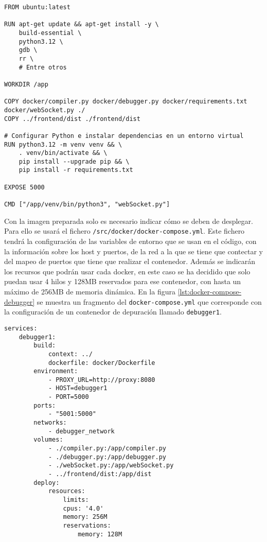 \begin{lstlisting}[caption={Dockerfile para el contenedor de depuración}, label={lst:dockerfile-debugger}]
FROM ubuntu:latest

RUN apt-get update && apt-get install -y \
    build-essential \
    python3.12 \
    gdb \
    rr \
    # Entre otros

WORKDIR /app

COPY docker/compiler.py docker/debugger.py docker/requirements.txt docker/webSocket.py ./
COPY ../frontend/dist ./frontend/dist

# Configurar Python e instalar dependencias en un entorno virtual
RUN python3.12 -m venv venv && \
    . venv/bin/activate && \
    pip install --upgrade pip && \
    pip install -r requirements.txt

EXPOSE 5000

CMD ["/app/venv/bin/python3", "webSocket.py"]
\end{lstlisting}


Con la imagen preparada solo es necesario indicar cómo se deben de desplegar. Para ello se usará el fichero \texttt{/src/docker/docker-compose.yml}. Este fichero tendrá la configuración de las variables de entorno que se usan en el código, con la información sobre los host y puertos, de la red a la que se tiene que contectar y del mapeo de puertos que tiene que realizar el contenedor. Además se indicarán los recursos que podrán usar cada docker, en este caso se ha decidido que solo puedan usar 4 hilos y 128MB reservados para ese contenedor, con hasta un máximo de 256MB de memoria dinámica. En la figura \ref{lst:docker-compose-debugger} se muestra un fragmento del \texttt{docker-compose.yml} que corresponde con la configuración de un contenedor de depuración llamado \texttt{debugger1}. 

\begin{lstlisting}[caption={Docker-compose.yml para un contenedor de depuración}, label={lst:docker-compose-debugger}]
services:
    debugger1:
        build:
            context: ../ 
            dockerfile: docker/Dockerfile
        environment:
            - PROXY_URL=http://proxy:8080 
            - HOST=debugger1
            - PORT=5000
        ports:
            - "5001:5000"
        networks:
            - debugger_network
        volumes:
            - ./compiler.py:/app/compiler.py
            - ./debugger.py:/app/debugger.py
            - ./webSocket.py:/app/webSocket.py
            - ../frontend/dist:/app/dist  
        deploy:
            resources:
                limits:
                cpus: '4.0'
                memory: 256M
                reservations:
                    memory: 128M
\end{lstlisting}

